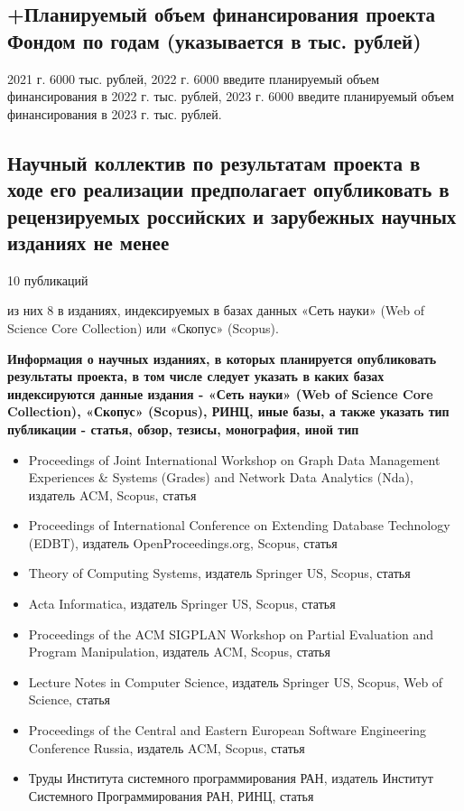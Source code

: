 \documentclass[12pt]{article}  %
\theoremstyle{remark}
\begin{document}
\subsection{+Планируемый объем финансирования проекта Фондом по годам (указывается в тыс. рублей)}
2021 г. 6000 тыс. рублей,
2022 г. 6000 введите планируемый объем финансирования в 2022 г. тыс. рублей,
2023 г. 6000 введите планируемый объем финансирования в 2023 г. тыс. рублей.

\subsection{Научный коллектив по результатам проекта в ходе его реализации предполагает опубликовать в рецензируемых российских и зарубежных научных изданиях не менее}

10 публикаций

из них 8 в изданиях, индексируемых в базах данных «Сеть науки» (Web of Science Core Collection) или «Скопус» (Scopus).

\textbf{Информация о научных изданиях, в которых планируется опубликовать результаты проекта, в том числе следует указать в каких базах индексируются данные издания - «Сеть науки» (Web of Science Core Collection), «Скопус» (Scopus), РИНЦ, иные базы, а также указать тип публикации - статья, обзор, тезисы, монография, иной тип}
\begin{itemize}
  \item Proceedings of Joint International Workshop on Graph Data Management Experiences \& Systems (Grades) and Network Data Analytics (Nda), издатель  ACM, Scopus, статья
  \item Proceedings of International Conference on Extending Database Technology (EDBT), издатель OpenProceedings.org, Scopus, статья
  \item Theory of Computing Systems, издатель Springer US, Scopus, статья
  \item Acta Informatica, издатель Springer US, Scopus, статья
  \item Proceedings of the ACM SIGPLAN Workshop on Partial Evaluation and Program Manipulation, издатель  ACM, Scopus, статья
  \item Lecture Notes in Computer Science, издатель Springer US, Scopus, Web of Science, статья
  \item Proceedings of the Central and Eastern European Software Engineering Conference Russia, издатель  ACM, Scopus, статья
  \item Труды Института системного программирования РАН, издатель Институт Системного Программирования РАН, РИНЦ, статья
\end{itemize}
\end{document}
